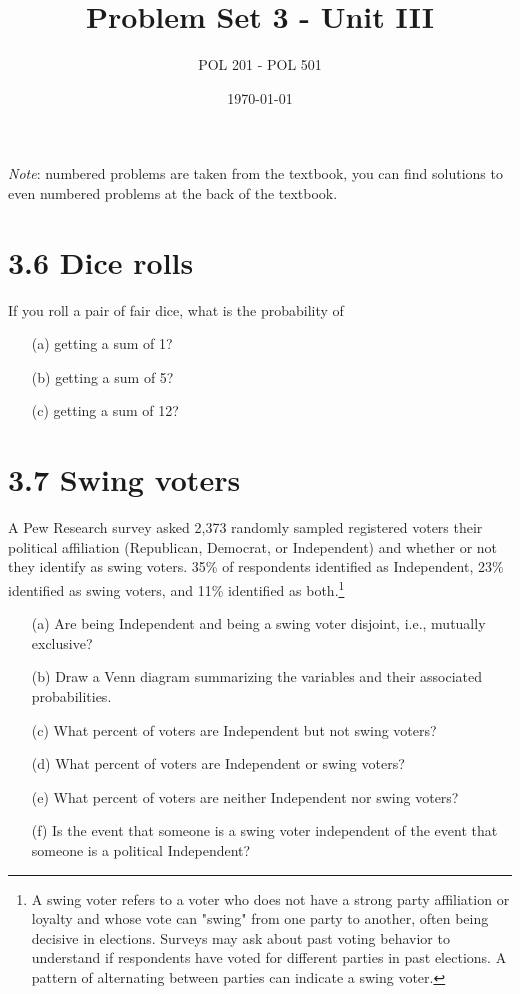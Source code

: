 \documentclass{article}
\title{Problem Set 3 - Unit III}
\author{POL 201 - POL 501}
\date{\today}
\begin{document}
\maketitle

\emph{Note}: numbered problems are taken from the textbook, you can find solutions to even numbered problems at the back of the textbook.

\section*{3.6 Dice rolls}
If you roll a pair of fair dice, what is the probability of
\begin{enumerate}
    \item[(a)] getting a sum of 1?
    \item[(b)] getting a sum of 5?
    \item[(c)] getting a sum of 12?
\end{enumerate}

\section*{3.7 Swing voters}
A Pew Research survey asked 2,373 randomly sampled registered voters their political affiliation (Republican, Democrat, or Independent) and whether or not they identify as swing voters. 35\% of respondents identified as Independent, 23\% identified as swing voters, and 11\% identified as both.\footnote{A swing voter refers to a voter who does not have a strong party affiliation or loyalty and whose vote can "swing" from one party to another, often being decisive in elections. Surveys may ask about past voting behavior to understand if respondents have voted for different parties in past elections. A pattern of alternating between parties can indicate a swing voter.}
\begin{enumerate}
    \item[(a)] Are being Independent and being a swing voter disjoint, i.e., mutually exclusive?
    \item[(b)] Draw a Venn diagram summarizing the variables and their associated probabilities.
    \item[(c)] What percent of voters are Independent but not swing voters?
    \item[(d)] What percent of voters are Independent or swing voters?
    \item[(e)] What percent of voters are neither Independent nor swing voters?
    \item[(f)] Is the event that someone is a swing voter independent of the event that someone is a political Independent?
\end{enumerate}
\end{document}
